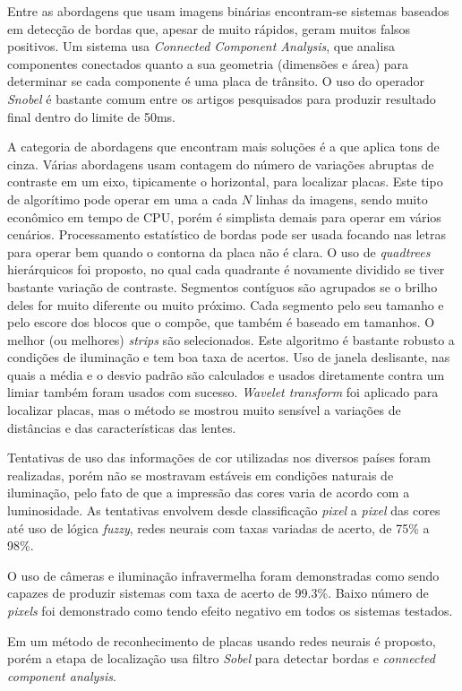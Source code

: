 Entre as abordagens que usam imagens binárias encontram-se sistemas baseados em
detecção de bordas que, apesar de muito rápidos, geram
muitos falsos positivos. Um sistema usa \emph{Connected Component Analysis},
que analisa componentes conectados quanto a sua geometria (dimensões e
área) para determinar se cada componente é uma placa de trânsito. O uso
do operador \emph{Snobel} é bastante comum entre os artigos pesquisados para
produzir resultado final dentro do limite de 50ms.

A categoria de abordagens que encontram mais soluções é a que aplica tons de
cinza. Várias abordagens usam
contagem do número de variações abruptas de contraste em um eixo,
tipicamente o horizontal, para localizar placas. Este tipo de algorítimo
pode operar em uma a cada $N$ linhas da imagens, sendo muito econômico em
tempo de CPU, porém é simplista demais para operar em vários cenários.
Processamento estatístico de bordas pode ser usada focando nas letras
para operar bem quando o contorna da placa não é clara. O uso de
\emph{quadtrees} hierárquicos foi proposto, no qual cada quadrante é novamente
dividido se tiver bastante variação de contraste. Segmentos contíguos são
agrupados se o brilho deles for muito diferente ou muito próximo. Cada
segmento pelo seu tamanho e pelo escore dos blocos que o compõe, que
também é baseado em tamanhos. O melhor (ou melhores) \emph{strips} são
selecionados. Este algoritmo é bastante robusto a condições de iluminação e
tem boa taxa de acertos. Uso de janela deslisante, nas quais a média e o
desvio padrão são calculados e usados diretamente contra um limiar
também foram usados com sucesso. \emph{Wavelet transform} foi aplicado para
localizar placas, mas o método se mostrou muito sensível a variações de
distâncias e das características das lentes.

Tentativas de uso das informações de cor utilizadas nos diversos
países foram realizadas, porém não se mostravam estáveis em condições
naturais de iluminação, pelo fato de que a impressão das cores varia de
acordo com a luminosidade. As tentativas envolvem desde classificação
\emph{pixel} a \emph{pixel} das cores até uso de lógica \emph{fuzzy}, redes
neurais com taxas variadas de acerto, de 75\% a 98\%.

O uso de câmeras e iluminação infravermelha foram demonstradas
como sendo capazes de produzir sistemas com taxa de acerto de 99.3\%.
Baixo número de \emph{pixels} foi demonstrado como tendo efeito negativo em
todos os sistemas testados.

Em  um método de reconhecimento de placas usando
redes neurais é proposto, porém a etapa de localização usa filtro \emph{Sobel}
para detectar bordas e \emph{connected component analysis}.

